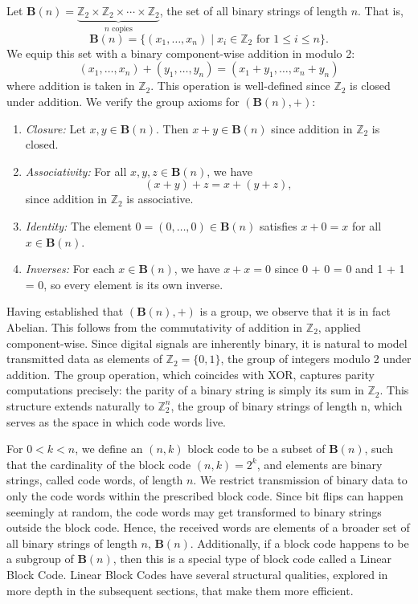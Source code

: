 \documentclass{article}
\begin{document}
Let \(\mathbf{B}(n) = \underbrace{\mathbb{Z}_2 \times \mathbb{Z}_2 \times \cdots \times 
\mathbb{Z}_2}_{n \text{ copies}}\), the set of all binary strings of length \(n\). That is,
\[
    \mathbf{B}(n) = \{ (x_1, \dots, x_n) \mid x_i \in \mathbb{Z}_2 \text { for }
  1 \le i \le n \}.
\]
We equip this set with a binary component-wise addition in modulo 2: 
\[ (x_1, \dots, x_n) + (y_1, \dots, y_n) = (x_1 + y_1, \dots, x_n + y_n)\]
where addition is taken in $\mathbb{Z}_2$. This operation is well-defined 
since \( \mathbb{Z}_2 \) is closed under addition. We verify the group axioms 
for \((\mathbf{B}(n), + )\):
\begin{enumerate}
    \item \textit{Closure: } Let \( x, y \in \mathbf{B}(n) \). Then \( x + y \in \mathbf{B}(n) \) 
        since addition in \( \mathbb{Z}_2 \) is closed.

    \item \textit{Associativity: } For all \( x, y, z \in \mathbf{B}(n) \), we have
    \[ (x + y) + z = x + (y + z), \] since addition in
    \( \mathbb{Z}_2 \) is associative.

\item \textit{Identity: } The element \( 0 = (0, \dots, 0) \in \mathbf{B}(n) \) satisfies 
    \( x + 0 = x \) for all \( x \in \mathbf{B}(n) \).

\item \textit{Inverses: } For each \( x \in \mathbf{B}(n) \), we have \( x + x = 0 \) since 0 + 0 = 0
    and 1 + 1 = 0, so every element is its own inverse.
\end{enumerate}
Having established that \( (\mathbf{B}(n), +) \) is a group, we observe that it is in
fact Abelian. This follows from the commutativity of addition in \( \mathbb{Z}_2 \), 
applied component-wise. Since digital signals are inherently binary, it is natural to 
model transmitted data as elements of \(\mathbb{Z}_2 = \{0, 1\}\), the group of integers
modulo 2 under addition. The group operation, which coincides with XOR, captures parity 
computations precisely: the parity of a binary string is simply its sum in \(\mathbb{Z}_2\).
This structure extends naturally to \(\mathbb{Z}_2^n\), the group of binary strings of 
length n, which serves as the space in which code words live. 

For \(0 < k < n\), we define an \((n, k)\) block code to be a subset of \(\mathbf{B}(n)\), 
such that the cardinality of the block code \((n, k) = 2^k\), and elements are binary strings, called code 
words, of length \(n\). We restrict transmission of binary data to only the code words within the prescribed 
block code. Since bit flips can happen seemingly at random, the code words may get transformed to binary 
strings outside the block code. Hence, the received words are elements of a broader set of all binary strings 
of length \(n\), \(\mathbf{B}(n)\). Additionally, if a block code happens to be a subgroup of \(\mathbf{B}(n)\),
then this is a special type of block code called a Linear Block Code. Linear Block Codes have several
structural qualities, explored in more depth in the subsequent sections, that make them more efficient. 
\end{document}
